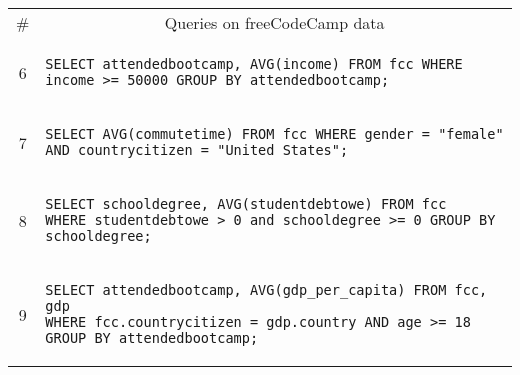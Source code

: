 {\begin{tabular}{cl}
\begin{minipage}{6in}
      \end{minipage}{queryno}\label[query]{q5}\\
  \midrule
  \# & \multicolumn{1}{c}{Queries on freeCodeCamp data} \\
  \midrule
  6 & 
      \begin{minipage}{6in}
\begin{lstlisting}[breaklines]
SELECT attendedbootcamp, AVG(income) FROM fcc WHERE income >= 50000 GROUP BY attendedbootcamp;
\end{lstlisting}
      \end{minipage}{queryno} \label[query]{q6} \\[-1.5ex]
  7 & 
      \begin{minipage}{6in}
\begin{lstlisting}[breaklines]
SELECT AVG(commutetime) FROM fcc WHERE gender = "female" AND countrycitizen = "United States";
\end{lstlisting}
      \end{minipage}{queryno} \label[query]{q7} \\[-1.5ex]
  8 & 
      \begin{minipage}{6in}
\begin{lstlisting}[breaklines]
SELECT schooldegree, AVG(studentdebtowe) FROM fcc
WHERE studentdebtowe > 0 and schooldegree >= 0 GROUP BY schooldegree;
\end{lstlisting}
      \end{minipage}{queryno} \label[query]{q8}\\[-1.5ex]
  9 & 
      \begin{minipage}{6in}
\begin{lstlisting}[breaklines]
SELECT attendedbootcamp, AVG(gdp_per_capita) FROM fcc, gdp 
WHERE fcc.countrycitizen = gdp.country AND age >= 18 GROUP BY attendedbootcamp;
\end{lstlisting}
      \end{minipage}{queryno} \label[query]{q9}\\[-1.5ex]
  \bottomrule
\end{tabular}
}
